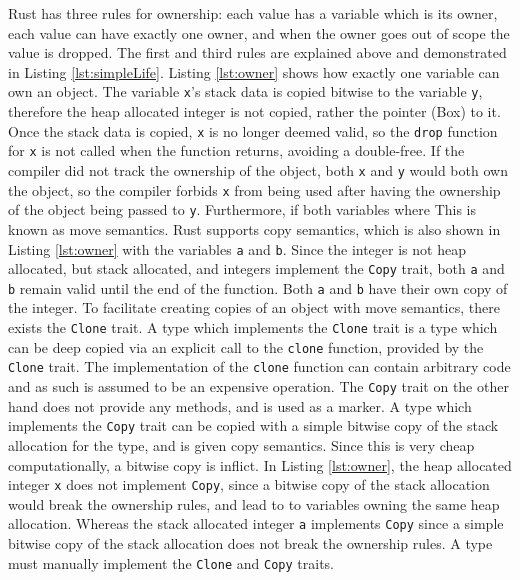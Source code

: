 \documentclass[10pt,a4paper,twocolumn]{article}
\begin{document}
Rust has three rules for ownership: each value has a variable which is its owner, each value
can have exactly one owner, and when the owner goes out of scope the value is dropped.
The first and third rules are explained above and demonstrated in Listing \ref{lst:simpleLife}.
Listing \ref{lst:owner} shows how exactly one variable can own an object.
The variable \lstinline{x}'s stack data is copied bitwise to the variable \lstinline{y}, therefore
the heap allocated integer is not copied, rather the pointer (Box) to it.
Once the stack data is copied, \lstinline{x} is no longer deemed valid, so the \lstinline{drop}
function for \lstinline{x} is not called when the function returns, avoiding a double-free.
If the compiler did not track the ownership of the object, both \lstinline{x} and \lstinline{y}
would both own the object, so the compiler forbids \lstinline{x} from being used after having the
ownership of the object being passed to \lstinline{y}.
Furthermore, if both variables where
This is known as move semantics.
Rust supports copy semantics, which is also shown in Listing \ref{lst:owner} with the variables
\lstinline{a} and \lstinline{b}.
Since the integer is not heap allocated, but stack allocated, and integers implement the
\lstinline{Copy} trait, both \lstinline{a} and \lstinline{b} remain valid until the end of the
function.
Both \lstinline{a} and \lstinline{b} have their own copy of the integer.
To facilitate creating copies of an object with move semantics, there exists the \lstinline{Clone}
trait.
A type which implements the \lstinline{Clone} trait is a type which can be deep copied via an
explicit call to the \lstinline{clone} function, provided by the \lstinline{Clone} trait.
The implementation of the \lstinline{clone} function can contain arbitrary code and as such is
assumed to be an expensive operation.
The \lstinline{Copy} trait on the other hand does not provide any methods, and is used as a marker.
A type which implements the \lstinline{Copy} trait can be copied with a simple bitwise copy of the
stack allocation for the type, and is given copy semantics.
Since this is very cheap computationally, a bitwise copy is inflict.
In Listing \ref{lst:owner}, the heap allocated integer \lstinline{x} does not implement
\lstinline{Copy}, since a bitwise copy of the stack allocation would break the ownership rules, and
lead to to variables owning the same heap allocation.
Whereas the stack allocated integer \lstinline{a} implements \lstinline{Copy} since a simple
bitwise copy of the stack allocation does not break the ownership rules.
A type must manually implement the \lstinline{Clone} and \lstinline{Copy} traits.
\end{document}
